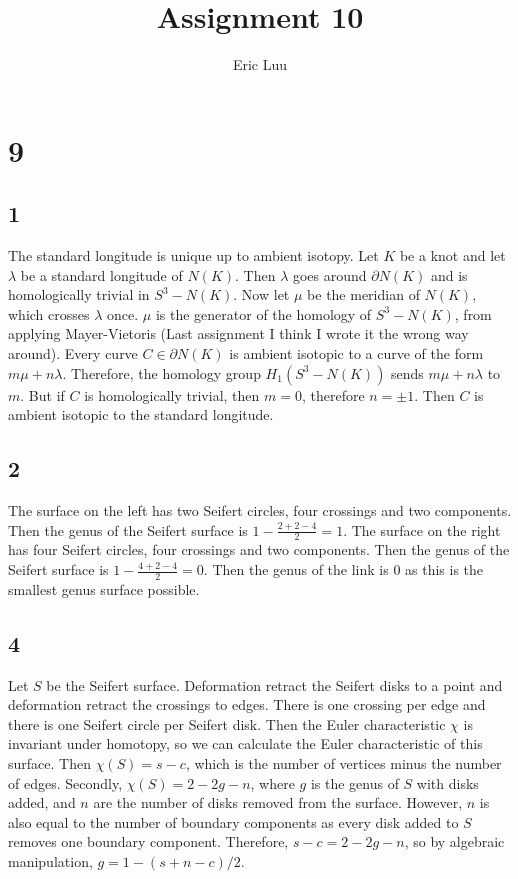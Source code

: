 \documentclass{article}
\title{Assignment 10}
\author{Eric Luu}
\theoremstyle{definition}
\numberwithin{theorem}{section}
\numberwithin{equation}{section}
\begin{document}
\section{9}
\subsection{1}
The standard longitude is unique up to ambient isotopy. Let $K$ be a knot and let $\lambda$ be a standard longitude of $N(K)$. Then $\lambda$ goes around $\partial N(K)$ and is homologically trivial in $S^3 - N(K)$. Now let $\mu$ be the meridian of $N(K)$, which crosses $\lambda$ once. $\mu$ is the generator of the homology of $S^3 - N(K)$, from applying Mayer-Vietoris (Last assignment I think I wrote it the wrong way around). Every curve $C \in \partial N(K)$ is ambient isotopic to a curve of the form $m \mu + n \lambda$. Therefore, the homology group $H_1(S^3 - N(K))$ sends $m \mu + n \lambda$ to $m$. But if $C$ is homologically trivial, then $m = 0$, therefore $n = \pm 1$. Then $C$ is ambient isotopic to the standard longitude. 

\subsection{2}
The surface on the left has two Seifert circles, four crossings and two components. Then the genus of the Seifert surface is $1 - \frac{2 + 2 - 4}{2} = 1$. The surface on the right has four Seifert circles, four crossings and two components. Then the genus of the Seifert surface is $1 - \frac{4 + 2 - 4}{2} = 0$. Then the genus of the link is 0 as this is the smallest genus surface possible. 

\subsection{4}
Let $S$ be the Seifert surface. 
Deformation retract the Seifert disks to a point and deformation retract the crossings to edges. There is one crossing per edge and there is one Seifert circle per Seifert disk. Then the Euler characteristic $\chi$ is invariant under homotopy, so we can calculate the Euler characteristic of this surface. Then $\chi(S) = s - c$, which is the number of vertices minus the number of edges. Secondly, $\chi(S) = 2 - 2g - n$, where $g$ is the genus of $S$ with disks added, and $n$ are the number of disks removed from the surface. However, $n$ is also equal to the number of boundary components as every disk added to $S$ removes one boundary component. Therefore, $s - c = 2 - 2g - n$, so by algebraic manipulation, $g = 1 - (s + n - c)/2$. 
\end{document}
